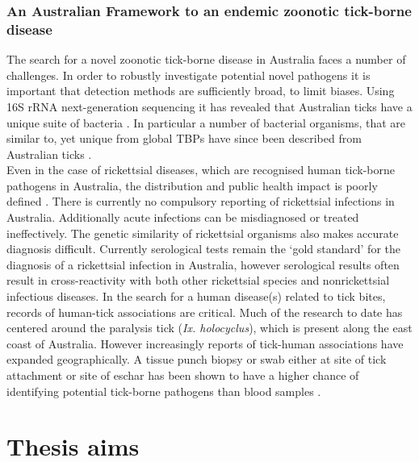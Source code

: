 \documentclass[a4paper, nobind]{templates/ociamthesis}
\begin{document}
\hypertarget{an-australian-framework-to-an-endemic-zoonotic-tick-borne-disease}{%
\subsection{An Australian Framework to an endemic zoonotic tick-borne disease}\label{an-australian-framework-to-an-endemic-zoonotic-tick-borne-disease}}

The search for a novel zoonotic tick-borne disease in Australia faces a number of challenges.
In order to robustly investigate potential novel pathogens it is important that detection methods are sufficiently broad, to limit biases.
Using 16S rRNA next-generation sequencing it has revealed that Australian ticks have a unique suite of bacteria \autocite{goftonBacterialProfilingReveals2015,goftonInhibitionEndosymbiontCandidatus2015}.
In particular a number of bacterial organisms, that are similar to, yet unique from global TBPs have since been described from Australian ticks \autocite{goftonPhylogeneticCharacterisationTwo2016,lohNovelBorreliaSpecies2016,goftonDetectionPhylogeneticCharacterisation2017,goftonNovelEhrlichiaSpecies2018}.\\
Even in the case of rickettsial diseases, which are recognised human tick-borne pathogens in Australia, the distribution and public health impact is poorly defined \autocite{stewartRickettsiaAustralisQueensland2017}.
There is currently no compulsory reporting of rickettsial infections in Australia.
Additionally acute infections can be misdiagnosed or treated ineffectively.
The genetic similarity of rickettsial organisms also makes accurate diagnosis difficult.
Currently serological tests remain the `gold standard' for the diagnosis of a rickettsial infection in Australia, however serological results often result in cross-reactivity with both other rickettsial species and nonrickettsial infectious diseases.
In the search for a human disease(s) related to tick bites, records of human-tick associations are critical.
Much of the research to date has centered around the paralysis tick (\emph{Ix. holocyclus}), which is present along the east coast of Australia.
However increasingly reports of tick-human associations have expanded geographically.
A tissue punch biopsy or swab either at site of tick attachment or site of eschar has been shown to have a higher chance of identifying potential tick-borne pathogens than blood samples \autocite{portilloGuidelinesDetectionRickettsia2017}.

\hypertarget{thesis-aims}{%
\chapter*{Thesis aims}\label{thesis-aims}}
\end{document}
